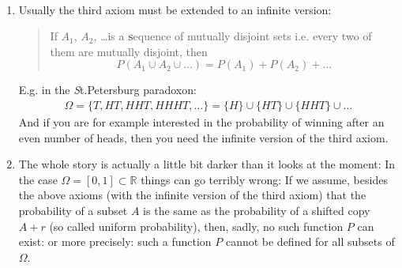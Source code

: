 \documentclass[twoside,11pt,a4paper]{article}
\newif\ifEN \ENtrue	                %
\def\tr|#1|#2|{\ifEN #2\else #1\fi}     %
\def\R{\mathbb{R}}
\theoremstyle{definition}
\begin{document}
\begin{remark}$\,$\\
  \begin{enumerate}
  \item \tr|Meist wird das dritte Axiom in seiner unendlichen Version verwendete: |Usually the third axiom must be extended to an infinite version: |
    \begin{quote}
      \tr|Wenn $A_1$, $A_2$, \ldots eine \textbf{Folge von paarweise disjunkten Mengen} ist, d.h. je zwei davon sind disjunkt, dann gilt:
         |If $A_1$, $A_2$, \ldots  is a \textbf{sequence of mutually disjoint sets} i.e. every two of them are mutually disjoint, then|
      $$
      P(A_1\cup A_2\cup \ldots)=P(A_1)+P(A_2)+\ldots
      $$
    \end{quote}
    \tr|Z.B. ist im \emph{St. Petersburg Paradox}:
       |E.g. in the \emph{St.Petersburg paradoxon}:|
    \begin{align*}
      \Omega=\{T,HT,HHT,HHHT,\ldots\}=\{H\}\cup\{HT\}\cup\{HHT\}\cup\ldots
    \end{align*}
    \tr|Und wenn Sie z.B. an der Wahrscheinlichkeit interessiert sind, nach einer geraden Anzahl \emph{Köpfen} zu gewinnen, dann brauchen Sie die unendliche 
        Version des dritten Axioms.
       |And if you are for example interested in the probability of winning after an even number of heads, then you need the infinite version of the third axiom.|
  \item 
    \tr|Die ganze Geschichte ist tatsächlich etwas verworrener: Für $\Omega=[0,1]\subset\R$ kann die Sache schiefgehen: Wenn wir annehmen, dass ausser den obigen 
        Axiome (mit der unendlichen Version des dritten Axioms) auch noch gelten soll, dass die Wahrscheinlichkeit einer Teilmenge $A$ gleich ist, wie die Wahrscheinlichkeit
        einer verschobenen Kopie von $A$, (eine solche Wahrscheinlichkeitsfunktion wird \emph{gleichmässig} genannt), dann kann -- leider -- eine solche Wahrscheinlichkeitsfunktion 
        nicht existieren, bzw. genauer: eine solche Wahrscheinlichkeitsfunktion kann nicht füra alle Teilmengen von $\Omega$ definiert sein. 
       |The whole story is actually a little bit darker than it looks at the moment: In the case $\Omega=[0,1]\subset\R$ things can go terribly wrong:  If we assume, 
        besides the above axioms (with the infinite version of the third axiom) that the probability of a subset $A$ is the same as the probability of a shifted copy $A+r$ 
        (so called uniform probability), then, sadly, no such function $P$ can exist: or more precisely: such a function $P$ cannot be defined for all subsets of $\Omega$. |

\end{enumerate}
\end{remark}
\end{document}
